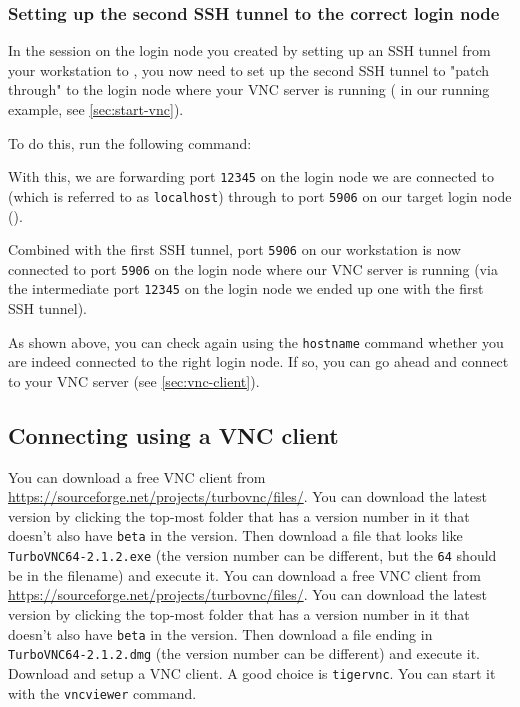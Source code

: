 \subsubsection{Setting up the second SSH tunnel to the correct login node}

In the session on the login node you created by setting up an SSH tunnel from your workstation
to \texttt{\loginnode}, you now need to set up the second SSH tunnel to "patch through" to the login
node where your VNC server is running (\texttt{\loginhost} in our running example, see \autoref{sec:start-vnc}).

To do this, run the following command:

\begin{prompt}
\end{prompt}

With this, we are forwarding port \lstinline|12345| on the login node we are connected to (which is referred
to as \lstinline|localhost|) through to port \lstinline|5906| on our target login node (\texttt{\loginhost}).

Combined with the first SSH tunnel, port \lstinline|5906| on our workstation is now connected to
port \lstinline|5906| on the login node where our VNC server is running (via the intermediate port \lstinline|12345|
on the login node we ended up one with the first SSH tunnel).


As shown above, you can check again using the \lstinline|hostname| command whether you are indeed connected
to the right login node. If so, you can go ahead and connect to your VNC server (see \autoref{sec:vnc-client}).

\subsection{Connecting using a VNC client}
\label{sec:vnc-client}

\ifwindows

You can download a free VNC client from \url{https://sourceforge.net/projects/turbovnc/files/}.
You can download the latest version by clicking the top-most folder that has a version number
in it that doesn't also have \lstinline|beta| in the version. Then download a file that looks like
\lstinline|TurboVNC64-2.1.2.exe| (the version number can be different, but the \lstinline|64|
should be in the filename) and execute it.
\fi
\ifmac
You can download a free VNC client from \url{https://sourceforge.net/projects/turbovnc/files/}.
You can download the latest version by clicking the top-most folder that has a version number
in it that doesn't also have \lstinline|beta| in the version. Then download a file ending in
\lstinline|TurboVNC64-2.1.2.dmg| (the version number can be different) and execute it.
\fi
\iflinux
Download and setup a VNC client. A good choice is \lstinline|tigervnc|. You can start
it with the \lstinline|vncviewer| command.
\fi

